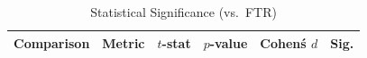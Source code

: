 \begin{table}[t]
\centering
\caption{Statistical Significance (vs.\ FTR)}
\label{tab:significance}
\begin{tabular}{llcccc}
\toprule
Comparison & Metric & $t$-stat & $p$-value & Cohen\'s $d$ & Sig. \\
\midrule
\bottomrule
\end{tabular}
\end{table}